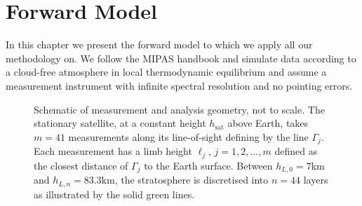 \chapter{Forward Model}
\label{ch:formodel}
In this chapter we present the forward model to which we apply all our methodology on. We follow the MIPAS handbook \cite{mipas2000handbook} and simulate data according to a cloud-free atmosphere in local thermodynamic equilibrium and assume a measurement instrument with infinite spectral resolution and no pointing errors.
\begin{figure}[ht!]
	\centering
	
	\caption[Schematic of measurement and analysis geometry.]{Schematic of measurement and analysis geometry, not to scale.
		The stationary satellite, at a constant height $h_\text{sat}$ above Earth, takes $m = 41$ measurements along its line-of-sight defining by the line $\Gamma_j$.
		Each measurement has a limb height $\ell_j$, $j=1,2,\dots,m$ defined as the closest distance of $\Gamma_j$ to the Earth surface.
		Between $h_{L,0} = 7$km and $h_{L,n} = 83.3$km, the stratosphere is discretised into $n =44$ layers as illustrated by the solid green lines.}
	\label{fig:LIMB}
\end{figure}


